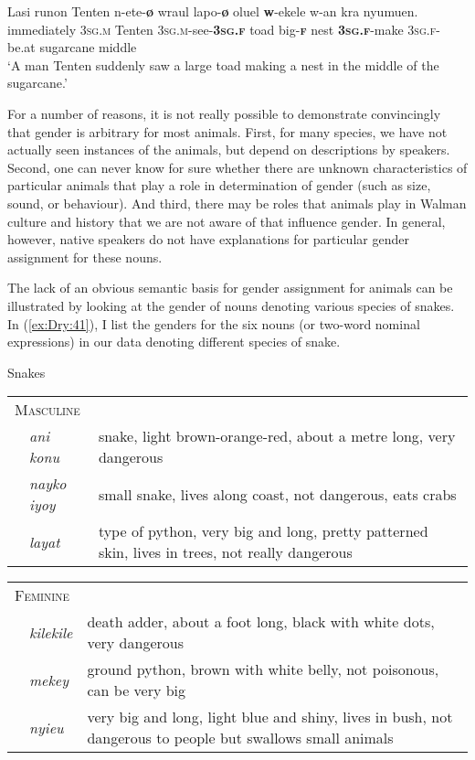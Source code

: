 \documentclass[output=collectionpaper]{langsci/langscibook}
\begin{document}
\ea \label{ex:Dry:40}
\gll Lasi	runon	Tenten	n-ete-\textbf{ø}	wraul lapo-\textbf{ø}	oluel	\textbf{w}-ekele	w-an kra	nyumuen.\\
immediately \textsc{3sg.m} Tenten \textsc{3sg.m}-see-\textbf{\textsc{3sg.f}} toad big-\textbf{\textsc{f}} nest \textbf{\textsc{3sg.f}}-make \textsc{3sg.f}-be.at sugarcane middle\\
\glt  `A man Tenten suddenly saw a large toad making a nest in the middle of the sugarcane.'
\z

For a number of reasons, it is not really possible to demonstrate convincingly that gender is arbitrary for most animals. First, for many species, we have not actually seen instances of the animals, but depend on descriptions by speakers. Second, one can never know for sure whether there are unknown characteristics of particular animals that play a role in determination of gender (such as size, sound, or behaviour). And third, there may be roles that animals play in Walman culture and history that we are not aware of that influence gender. In general, however, native speakers do not have explanations for particular gender assignment for these nouns.

The lack of an obvious semantic basis for gender assignment for animals can be illustrated by looking at the gender of nouns denoting various species of snakes. In (\ref{ex:Dry:41}), I list the genders for the six nouns (or two-word nominal expressions) in our data denoting different species of snake.

\ea   \label{ex:Dry:41}
Snakes

\begin{tabularx}{0.9\textwidth}{lp{1.8cm}X}
\multicolumn{3}{l}{\textsc{Masculine}} \\
& \textit{ani konu} & snake, light brown-orange-red, about a metre long, very dangerous\\
& \textit{nayko iyoy} & small snake, lives along coast, not dangerous, eats crabs\\
& \textit{layat} & type of python, very big and long, pretty patterned skin, lives in trees, not really dangerous\\
\end{tabularx}

\begin{tabularx}{0.9\textwidth}{lp{1.8cm}X}
\multicolumn{3}{l}{\textsc{Feminine}}\\
  & \textit{kilekile} & death adder, about a foot long, black with white dots, very dangerous\\
& \textit{mekey} & ground python, brown with white belly, not poisonous, can be very big\\
& \textit{nyieu} & very big and long, light blue and shiny, lives in bush, not dangerous to people but swallows small animals\\
\end{tabularx}
\z
\end{document}
